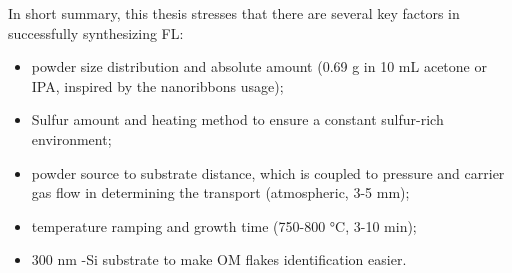 In short summary, this thesis stresses that there are several key factors in successfully synthesizing  FL:
\begin{itemize}
\item {} powder size distribution and absolute amount (0.69 g  in 10 mL acetone or IPA, inspired by the  nanoribbons usage);
\item Sulfur amount and heating method to ensure a constant sulfur-rich environment;
\item {} powder source to substrate distance, which is coupled to pressure and carrier gas flow in determining the transport (atmospheric, 3-5 mm);
\item temperature ramping and growth time (750-800 \si{\degreeCelsius}, 3-10 min);
\item 300 nm -Si substrate to make OM flakes identification easier.
\end{itemize}

